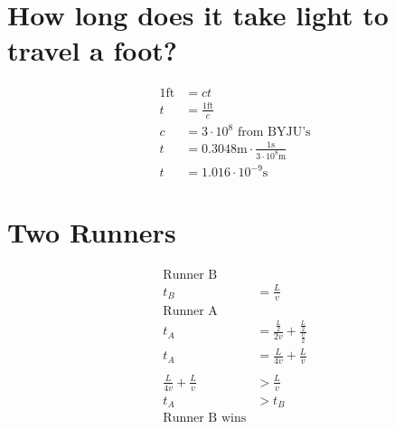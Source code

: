 \documentclass[11pt,letterpaper, twocolumn]{article}
\begin{document}
\section{How long does it take light to travel a foot?}
\begin{align*}
    1\text{ft} &= ct\\
    t &= \frac{1\text{ft}}{c}\\
    c&=3 \cdot 10^8  \text{ from BYJU's}\\
    t &= 0.3048\text{m} \cdot \frac{1\text{s}}{3 \cdot 10^8\text{m}}\\
    t &= 1.016 \cdot 10^{-9} \text{s}
\end{align*}

\section{Two Runners}
\begin{align*}
    \text{Runner B}\\
    t_B &= \frac{L}{v}\\
    \text{Runner A}\\
    t_A &= \frac{\frac{L}{2}}{2v} + \frac{\frac{L}{2}}{\frac{v}{2}}\\
    t_A &= \frac{L}{4v} + \frac{L}{v}\\
    \\
    \frac{L}{4v} + \frac{L}{v} &> \frac{L}{v}\\
    t_A&>t_B\\
    \text{Runner B wins}\\
\end{align*}
\end{document}
